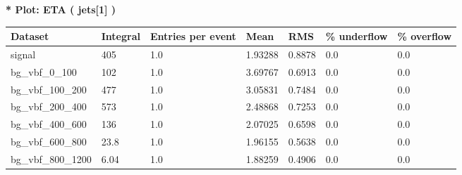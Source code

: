 \documentclass[a4paper, 10pt]{article}
\begin{document}
\textbf{* Plot: ETA ( jets[1] ) }\\
   \begin{table}[H]
  \begin{center}
    \begin{tabular}{|m{23.0mm}|m{23.0mm}|m{18.0mm}|m{19.0mm}|m{19.0mm}|m{19.0mm}|m{19.0mm}|}
      \hline
      {\cellcolor{yellow}         Dataset}& {\cellcolor{yellow}         Integral}& {\cellcolor{yellow}         Entries per event}& {\cellcolor{yellow}         Mean}& {\cellcolor{yellow}         RMS}& {\cellcolor{yellow}         \% underflow}& {\cellcolor{yellow}         \% overflow}\\
      \hline
      {\cellcolor{white}         signal}& {\cellcolor{white}         405}& {\cellcolor{white}         1.0}& {\cellcolor{white}         1.93288}& {\cellcolor{white}         0.8878}& {\cellcolor{green}         0.0}& {\cellcolor{green}         0.0}\\
      \hline
      {\cellcolor{white}         bg\_vbf\_0\_100}& {\cellcolor{white}         102}& {\cellcolor{white}         1.0}& {\cellcolor{white}         3.69767}& {\cellcolor{white}         0.6913}& {\cellcolor{green}         0.0}& {\cellcolor{green}         0.0}\\
      \hline
      {\cellcolor{white}         bg\_vbf\_100\_200}& {\cellcolor{white}         477}& {\cellcolor{white}         1.0}& {\cellcolor{white}         3.05831}& {\cellcolor{white}         0.7484}& {\cellcolor{green}         0.0}& {\cellcolor{green}         0.0}\\
      \hline
      {\cellcolor{white}         bg\_vbf\_200\_400}& {\cellcolor{white}         573}& {\cellcolor{white}         1.0}& {\cellcolor{white}         2.48868}& {\cellcolor{white}         0.7253}& {\cellcolor{green}         0.0}& {\cellcolor{green}         0.0}\\
      \hline
      {\cellcolor{white}         bg\_vbf\_400\_600}& {\cellcolor{white}         136}& {\cellcolor{white}         1.0}& {\cellcolor{white}         2.07025}& {\cellcolor{white}         0.6598}& {\cellcolor{green}         0.0}& {\cellcolor{green}         0.0}\\
      \hline
      {\cellcolor{white}         bg\_vbf\_600\_800}& {\cellcolor{white}         23.8}& {\cellcolor{white}         1.0}& {\cellcolor{white}         1.96155}& {\cellcolor{white}         0.5638}& {\cellcolor{green}         0.0}& {\cellcolor{green}         0.0}\\
      \hline
      {\cellcolor{white}         bg\_vbf\_800\_1200}& {\cellcolor{white}         6.04}& {\cellcolor{white}         1.0}& {\cellcolor{white}         1.88259}& {\cellcolor{white}         0.4906}& {\cellcolor{green}         0.0}& {\cellcolor{green}         0.0}\\

\end{tabular}
\end{center}
\end{table}
\end{document}
